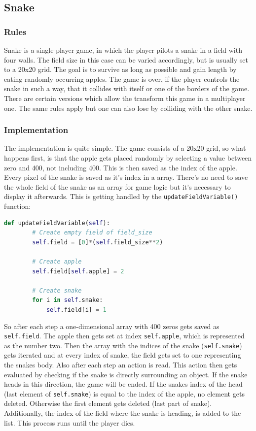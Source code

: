 \documentclass[12pt]{article}
\begin{document}
\subsection{Snake}
\subsubsection{Rules}
Snake is a single-player game, in which the player pilots a snake in a field with four walls. The field size in this case can be varied accordingly, but is usually set to a 20x20 grid. The goal is to survive as long as possible and gain length by eating randomly occurring apples. The game is over, if the player controls the snake in such a way, that it collides with itself or one of the borders of the game. There are certain versions which allow the transform this game in a multiplayer one. The same rules apply but one can also lose by colliding with the other snake.
\subsubsection{Implementation}
The implementation is quite simple. The game consists of a 20x20 grid, so what happens first, is that the apple gets placed randomly by selecting a value between zero and 400, not including 400. This is then saved as the index of the apple. Every pixel of the snake is saved as it's index in a array. There's no need to save the whole field of the snake as an array for game logic but it's necessary to display it afterwards. This is getting handled by the \lstinline{updateFieldVariable()} function:
\begin{lstlisting}[language=Python, caption=Example - Create a snake field every second of size \lstinline{self.field_size}]
    def updateFieldVariable(self):
        # Create empty field of field_size
        self.field = [0]*(self.field_size**2)

        # Create apple
        self.field[self.apple] = 2
        
        # Create snake
        for i in self.snake:
            self.field[i] = 1
\end{lstlisting}
So after each step a one-dimensional array with 400 zeros gets saved as \lstinline{self.field}. The apple then gets set at index \lstinline{self.apple}, which is represented as the number two. Then the array with the indices of the snake (\lstinline{self.snake}) gets iterated and at every index of snake, the field gets set to one representing the snakes body. Also after each step an action is read. This action then gets evaluated by checking if the snake is directly surrounding an object. If the snake heads in this direction, the game will be ended. If the snakes index of the head (last element of \lstinline{self.snake}) is equal to the index of the apple, no element gets deleted. Otherwise the first element gets deleted (last part of snake). Additionally, the index of the field where the snake is heading, is added to the list. This process runs until the player dies.
\end{document}
